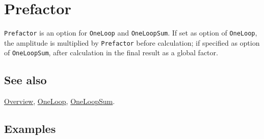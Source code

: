 \documentclass[../FeynCalcManual.tex]{subfiles}
\begin{document}
\hypertarget{prefactor}{%
\section{Prefactor}\label{prefactor}}

\texttt{Prefactor} is an option for \texttt{OneLoop} and
\texttt{OneLoopSum}. If set as option of \texttt{OneLoop}, the amplitude
is multiplied by \texttt{Prefactor} before calculation; if specified as
option of \texttt{OneLoopSum}, after calculation in the final result as
a global factor.

\subsection{See also}

\hyperlink{toc}{Overview}, \hyperlink{oneloop}{OneLoop},
\hyperlink{oneloopsum}{OneLoopSum}.

\subsection{Examples}
\end{document}
